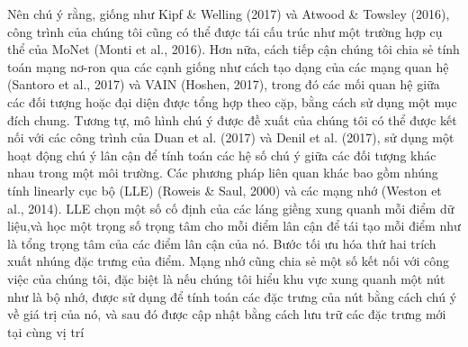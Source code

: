 Nên chú ý rằng, giống như Kipf \& Welling (2017) và Atwood \& Towsley (2016), công trình của chúng tôi cũng có thể được tái cấu trúc như một trường hợp cụ thể của MoNet (Monti et al., 2016). Hơn nữa, cách tiếp cận chúng tôi chia sẻ tính toán mạng nơ-ron qua các cạnh giống như cách tạo dạng của các mạng quan hệ (Santoro et al., 2017) và VAIN (Hoshen, 2017), trong đó các mối quan hệ giữa các đối tượng hoặc đại diện được tổng hợp theo cặp, bằng cách sử dụng một mục đích chung. Tương tự, mô hình chú ý được đề xuất của chúng tôi có thể được kết nối với các công trình của Duan et al. (2017) và Denil et al. (2017), sử dụng một hoạt động chú ý lân cận để tính toán các hệ số chú ý giữa các đối tượng khác nhau trong một môi trường. Các phương pháp liên quan khác bao gồm nhúng tính linearly cục bộ (LLE) (Roweis \& Saul, 2000) và các mạng nhớ (Weston et al., 2014). LLE chọn một số cố định của các láng giềng xung quanh mỗi điểm dữ liệu,và học một trọng số trọng tâm cho mỗi điểm lân cận để tái tạo mỗi điểm như là tổng trọng tâm của các điểm lân cận của nó. Bước tối ưu hóa thứ hai trích xuất nhúng đặc trưng của điểm. Mạng nhớ cũng chia sẻ một số kết nối với công việc của chúng tôi, đặc biệt là nếu chúng tôi hiểu khu vực xung quanh một nút như là bộ nhớ, được sử dụng để tính toán các đặc trưng của nút bằng cách chú ý về giá trị của nó, và sau đó được cập nhật bằng cách lưu trữ các đặc trưng mới tại cùng vị trí 



